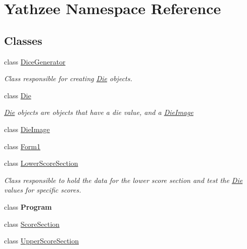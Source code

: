 \hypertarget{namespace_yathzee}{}\section{Yathzee Namespace Reference}
\label{namespace_yathzee}
\subsection*{Classes}
\begin{DoxyCompactItemize}
\item 
class \hyperlink{class_yathzee_1_1_dice_generator}{Dice\+Generator}
\begin{DoxyCompactList}\small\item\em Class responsible for creating \hyperlink{class_yathzee_1_1_die}{Die} objects. \end{DoxyCompactList}\item 
class \hyperlink{class_yathzee_1_1_die}{Die}
\begin{DoxyCompactList}\small\item\em \hyperlink{class_yathzee_1_1_die}{Die} objects are objects that have a die value, and a \hyperlink{class_yathzee_1_1_die_image}{Die\+Image} \end{DoxyCompactList}\item 
class \hyperlink{class_yathzee_1_1_die_image}{Die\+Image}
\item 
class \hyperlink{class_yathzee_1_1_form1}{Form1}
\item 
class \hyperlink{class_yathzee_1_1_lower_score_section}{Lower\+Score\+Section}
\begin{DoxyCompactList}\small\item\em Class responsible to hold the data for the lower score section and test the \hyperlink{class_yathzee_1_1_die}{Die} values for specific scores. \end{DoxyCompactList}\item 
class {\bfseries Program}
\item 
class \hyperlink{class_yathzee_1_1_score_section}{Score\+Section}
\item 
class \hyperlink{class_yathzee_1_1_upper_score_section}{Upper\+Score\+Section}
\end{DoxyCompactItemize}
